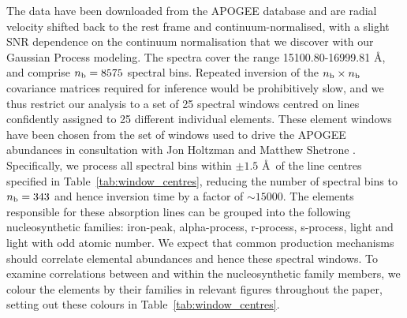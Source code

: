 \documentclass[a4paper,fleqn,usenatbib]{mnras}
\newcommand{\nb}{n_{\rm b}}
\begin{document}
The data have been downloaded from the APOGEE database and are radial velocity shifted back to the rest frame and continuum-normalised, with a slight SNR dependence on the continuum normalisation that we discover with our Gaussian Process modeling. The spectra cover the range 15100.80-16999.81 \AA, and comprise $\nb = 8575$ spectral bins. Repeated inversion of the $\nb \times \nb$ covariance matrices required for inference would be prohibitively slow, and we thus restrict our analysis to a set of 25 spectral windows centred on lines confidently assigned to 25 different individual elements. These element windows have been chosen from the set of windows used to drive the APOGEE abundances in consultation with Jon Holtzman and Matthew Shetrone \citep{Holtzman2015, Shetrone2015}. Specifically, we process all spectral bins within $\pm 1.5$ \AA\ of the line centres specified in Table~\ref{tab:window_centres}, reducing the number of spectral bins to $\nb = 343$ and hence inversion time by a factor of $\sim15000$. %
The elements responsible for these absorption lines can be grouped into the following nucleosynthetic families: iron-peak, alpha-process, r-process, s-process, light and light with odd atomic number. We expect that common production mechanisms should correlate elemental abundances and hence these spectral windows. To examine correlations between and within the nucleosynthetic family members, we colour the elements by their families in relevant figures throughout the paper, setting out these colours in Table~\ref{tab:window_centres}.
\end{document}
